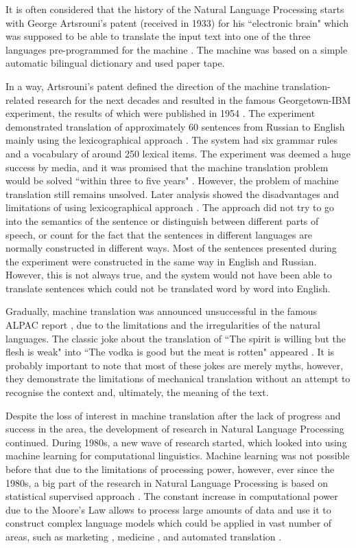 It is often considered that the history of the Natural Language Processing starts with George Artsrouni's patent (received in 1933) for his ``electronic brain" which was supposed to be able to translate the input text into one of the three languages pre-programmed for the machine \cite{hutchins2004two}. The machine was based on a simple automatic bilingual dictionary and used paper tape. 

In a way, Artsrouni's patent defined the direction of the machine translation-related research for the next decades and resulted in the famous Georgetown-IBM experiment, the results of which were published in 1954 \cite{dostert1955georgetown}. The experiment demonstrated translation of approximately 60 sentences from Russian to English mainly using the lexicographical approach \cite{hutchins2004georgetown}. The system had six grammar rules and a vocabulary of around 250 lexical items. The experiment was deemed a huge success by media, and it was promised that the machine translation problem would be solved ``within three to five years" \cite{plumb1954russian}. However, the problem of machine translation still remains unsolved. Later analysis showed the disadvantages and limitations of using lexicographical approach \cite{garvin1968georgetown}. The approach did not try to go into the semantics of the sentence or distinguish between different parts of speech, or count for the fact that the sentences in different languages are normally constructed in different ways. Most of the sentences presented during the experiment were constructed in the same way in English and Russian. However, this is not always true, and the system would not have been able to translate sentences which could not be translated word by word into English. 

Gradually, machine translation was announced unsuccessful in the famous ALPAC report \cite{national1966language}, due to the limitations and the irregularities of the natural languages. The classic joke about the translation of ``The spirit is willing but the flesh is weak" into ``The vodka is good but the meat is rotten" appeared \cite{hutchins1995whisky}. It is probably important to note that most of these jokes are merely myths, however, they demonstrate the limitations of mechanical translation without an attempt to recognise the context and, ultimately, the meaning of the text.

Despite the loss of interest in machine translation after the lack of progress and success in the area, the development of research in Natural Language Processing continued. During 1980s, a new wave of research started, which looked into using machine learning for computational linguistics. Machine learning was not possible before that due to the limitations of processing power, however, ever since the 1980s, a big part of the research in Natural Language Processing is based on statistical supervised approach \cite{mcqueen1995applying, bergsma2010creating}. The constant increase in computational power due to the Moore's Law allows to process large amounts of data and use it to construct complex language models which could be applied in vast number of areas, such as marketing \cite{goldberg1999automated}, medicine \cite{demner2009can}, and automated translation \cite{brants2007large}.

